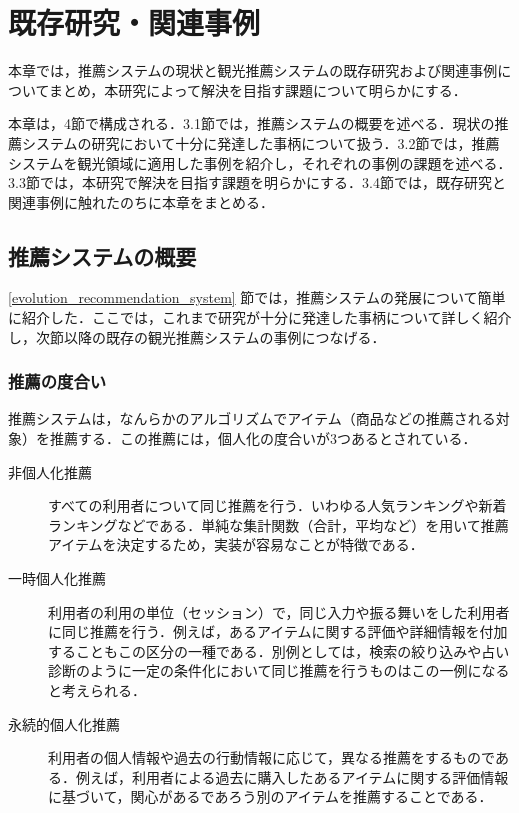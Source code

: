 \documentclass{jsarticle}
\begin{document}
\newpage

\section{既存研究・関連事例}

本章では，推薦システムの現状と観光推薦システムの既存研究および関連事例についてまとめ，本研究によって解決を目指す課題について明らかにする．

本章は，4節で構成される．3.1節では，推薦システムの概要を述べる．現状の推薦システムの研究において十分に発達した事柄について扱う．3.2節では，推薦システムを観光領域に適用した事例を紹介し，それぞれの事例の課題を述べる．3.3節では，本研究で解決を目指す課題を明らかにする．3.4節では，既存研究と関連事例に触れたのちに本章をまとめる．

\newpage
\subsection{推薦システムの概要}

\ref{evolution_recommendation_system} 節では，推薦システムの発展について簡単に紹介した．ここでは，これまで研究が十分に発達した事柄について詳しく紹介し，次節以降の既存の観光推薦システムの事例につなげる．

\subsubsection{推薦の度合い}

推薦システムは，なんらかのアルゴリズムでアイテム（商品などの推薦される対象）を推薦する．この推薦には，個人化の度合いが3つあるとされている\cite{define_of_recommendation_system}\cite{recommendation_type_of_personalize}．

\begin{description}
\item[非個人化推薦] すべての利用者について同じ推薦を行う．いわゆる人気ランキングや新着ランキングなどである．単純な集計関数（合計，平均など）を用いて推薦アイテムを決定するため，実装が容易なことが特徴である．
\item[一時個人化推薦] 利用者の利用の単位（セッション）で，同じ入力や振る舞いをした利用者に同じ推薦を行う．例えば，あるアイテムに関する評価や詳細情報を付加することもこの区分の一種である．別例としては，検索の絞り込みや占い診断のように一定の条件化において同じ推薦を行うものはこの一例になると考えられる．
\item[永続的個人化推薦] 利用者の個人情報や過去の行動情報に応じて，異なる推薦をするものである．例えば，利用者による過去に購入したあるアイテムに関する評価情報に基づいて，関心があるであろう別のアイテムを推薦することである．
\end{description}
\end{document}
